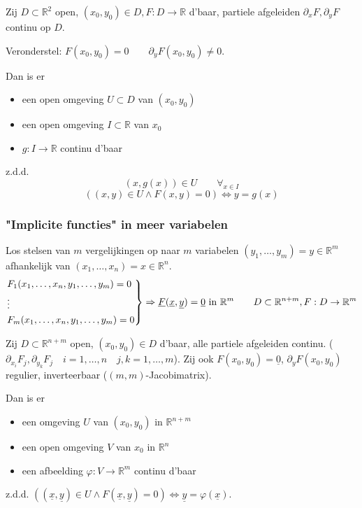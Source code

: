 \documentclass[a4paper]{exam}
\theoremstyle{definition}
\newcommand{\reals}{\mathbb{R}}
\begin{document}
			 Zij $D \subset \reals^2$ open, $ (x_0 , y_0 ) \in D, F:D \rightarrow \reals $ d'baar, partiele afgeleiden $ \partial_x F, \partial_y F $ continu op $ D $.
			
			Veronderstel: $ F(x_0, y_0) = 0 \qquad \partial_y F(x_0, y_0)\neq 0 $.
			
			Dan is er 
			\begin{itemize} 
				\item[] een open omgeving $ U \subset D $ van $ (x_0,y_0) $
				\item[] een open omgeving $ I \subset \reals $ van $ x_0 $
				\item[] $ g: I \rightarrow \reals $ continu d'baar 
			\end{itemize}
			z.d.d.
			\[ (x,g(x)) \in U \qquad \forall_{x \in I} \]
			\[ ((x,y) \in U \wedge F(x,y)=0) \Leftrightarrow y=g(x) \]
			
			
			\subsubsection{"Implicite functies" in meer variabelen}
				Los stelsen van $m$ vergelijkingen op naar $m$ variabelen $(y_1, \dots ,y_m) = y \in \reals^m$ afhankelijk van $ (x_1, \dots , x_n) = x \in \reals^n $.
				\[
				\begin{rcases*}
				F_1(x_1,\dots,x_n,y_1,\dots,y_m)=0 \\
				\vdots \\
				F_m(x_1,\dots,x_n,y_1,\dots,y_m)=0
				\end{rcases*} \Rightarrow \underline{F}(\underline{x},\underline{y})=\underline{0} \text{ in } \reals^m \qquad D \subset \reals^{n+m}, F: D \rightarrow \reals^m
				\]
				
				 Zij $ D\subset \reals^{n+m} $ open, $ (x_0, y_0) \in D $ d'baar, alle partiele afgeleiden continu. ($ \partial_{x_i}F_j , \partial_{y_k}F_j \quad i=1,\dots,n \quad j,k=1,\dots,m $). Zij ook $ F(x_0, y_0) = \underline{0}$, $ \partial_y F(x_0,y_0) $ regulier, inverteerbaar ($ (m,m) $-Jacobimatrix).
				
				Dan is er \begin{itemize}
					\item[] een omgeving $ U $ van $ (x_0,y_0) $ in $ \reals^{n+m} $
					\item[] een open omgeving $V$ van $x_0$ in $\reals^n$
					\item[] een afbeelding $ \varphi : V\rightarrow \reals^m $ continu d'baar 
				\end{itemize}
				z.d.d. $ ((\underline{x},\underline{y}) \in U \wedge F(\underline{x},\underline{y})=0) \Leftrightarrow \underline{y}=\varphi (\underline{x}). $
				
\end{document}

